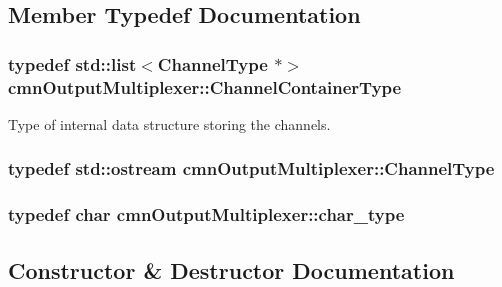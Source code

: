 \subsection{Member Typedef Documentation}
\hypertarget{classcmn_output_multiplexer_aca2d6dc567cf721a0dbb2f887c175b7b}{}
\subsubsection[{Channel\+Container\+Type}]{\setlength{\rightskip}{0pt plus 5cm}typedef std\+::list$<${\bf Channel\+Type} $\ast$$>$ {\bf cmn\+Output\+Multiplexer\+::\+Channel\+Container\+Type}}\label{classcmn_output_multiplexer_aca2d6dc567cf721a0dbb2f887c175b7b}
Type of internal data structure storing the channels. \hypertarget{classcmn_output_multiplexer_abebdbc4cebf9eeb2ce4159f2c649968e}{}
\subsubsection[{Channel\+Type}]{\setlength{\rightskip}{0pt plus 5cm}typedef std\+::ostream {\bf cmn\+Output\+Multiplexer\+::\+Channel\+Type}}\label{classcmn_output_multiplexer_abebdbc4cebf9eeb2ce4159f2c649968e}
\hypertarget{classcmn_output_multiplexer_aa35542dd7f4e6d55780bc7ed741910fe}{}
\subsubsection[{char\+\_\+type}]{\setlength{\rightskip}{0pt plus 5cm}typedef char {\bf cmn\+Output\+Multiplexer\+::char\+\_\+type}}\label{classcmn_output_multiplexer_aa35542dd7f4e6d55780bc7ed741910fe}


\subsection{Constructor \& Destructor Documentation}
\hypertarget{classcmn_output_multiplexer_ae508d920a59799588a6bcd87a5e33f50}{}
